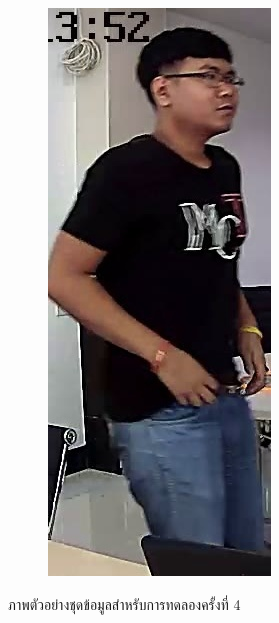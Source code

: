 \begin{figure}[!ht]
\begin{subfigure}[b]{0.1\textwidth}
        \label{fig:ex_5}
    \end{subfigure}
    \begin{subfigure}[b]{0.1\textwidth}
        \centering
        \includegraphics[width=\textwidth]{chapter4/images/fei_3.jpg}
        \label{fig:ex_6}
    \end{subfigure}
    \caption{ภาพตัวอย่างชุดข้อมูลสำหรับการทดลองครั้งที่ 4}
    \label{fig: ภาพตัวอย่างชุดข้อมูลสำหรับการทดลอง 4}
\end{figure}

